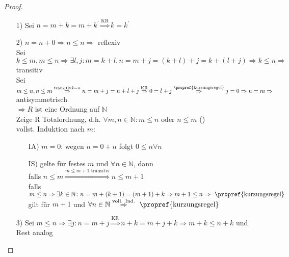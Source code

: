 \begin{proof}
	\begin{itemize}
		\item[1)] Sei $n=m+k=m+k^{'} \overset{\text{KR}}{\Rightarrow} k = k^{'}$
		\item[2)] $n=n+0 \Rightarrow n \leq n \Rightarrow$  reflexiv \\
		Sei $k \leq m , m \leq n \Rightarrow \exists l,j \colon m = k+l, n = m+j = (k+l)+j = k + (l+j) \Rightarrow k \leq n \Rightarrow$ transitiv\\
		Sei $m \leq n, n \leq m \overset{\text{transitiv} k = n}{\Rightarrow} n = m + j = n + l + j \overset{\text{KR}}{\Rightarrow} 0 = l+j \overset{\text{\propref{kurzungsregel}}}{\Rightarrow} j =0 \Rightarrow n = m \Rightarrow$ antisymmetrisch\\
		$\Rightarrow R$ ist eine Ordnung auf $\mathbb{N}$\\
		Zeige R Totalordnung, d.h. $\forall m,n \in \mathbb{N}\colon m \leq n \text{ oder } n \leq m$ ()\\
		vollst. Induktion nach $m$:
		\begin{itemize}
			\item[IA)] $m=0$: wegen $n = 0 + n$ folgt $0 \leq n \forall n$
			\item[IS)] gelte  für festes $m$ und $\forall n \in \mathbb{N}$, dann \\
			falls $n \leq m \overset{m \leq m + 1 \text{ transitiv}}{\Rightarrow} n \leq m + 1$\\
			falls $m \leq n \Rightarrow \exists k \in \mathbb{N} \colon n = m + (k+1) = (m+1) + k \Rightarrow m +1 \leq n \Rightarrow \text{ \propref{kurzungsregel}}$ gilt für $m +1$ und $\forall n \in \mathbb{N} \overset{\text{voll. Ind.}}{\Rightarrow} \text{ \propref{kurzungsregel}}$
		\end{itemize}
		\item[3)] Sei $m \leq n \Rightarrow \exists j\colon n = m + j \overset{\text{KR}}{\Rightarrow} n + k = m + j + k \Rightarrow m + k \leq n + k$ und Rest analog
	\end{itemize}
\end{proof}